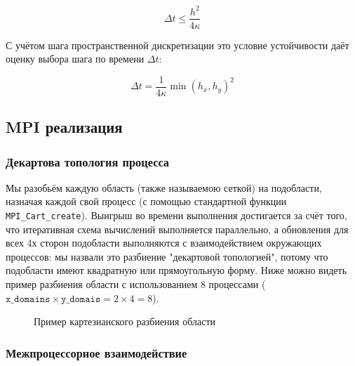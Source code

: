 \documentclass[a4paper]{extarticle}
\begin{document}
\begin{equation}
	\Delta{t}\leqslant\frac{h^2}{4\kappa}
\end{equation}

С учётом шага пространственной дискретизации это условие устойчивости даёт оценку выбора шага по времени $\Delta{t}$:

\begin{equation}
\Delta{t} = \frac{1}{4\kappa}\min(h_x,h_y)^2
\end{equation}

\subsection{MPI реализация}

\setcounter{figure}{0}

\subsubsection{Декартова топология процесса}

Мы разобьём каждую область (также называемою сеткой) на подобласти, назначая каждой свой процесс (с помощью стандартной функции \texttt{MPI\_Cart\_create}{\cite{mpidoc}}). Выигрыш во времени выполнения достигается за счёт того, что итеративная схема вычислений выполняется параллельно, а обновления для всех 4х сторон подобласти выполняются с взаимодействием окружающих процессов: мы назвали это разбиение "декартовой топологией", потому что подобласти имеют квадратную или прямоугольную форму. Ниже можно видеть пример разбиения области с использованием 8 процессами ($\mathtt{x\_domains} \times \mathtt{y\_domais} = 2 \times 4 = 8$).

\begin{figure}[h]
\centering
{}
\captionsetup{labelfont=bf, labelsep=space}
\caption{Пример картезианского разбиения области}
\end{figure}

\subsubsection{Межпроцессорное взаимодействие}
\end{document}
